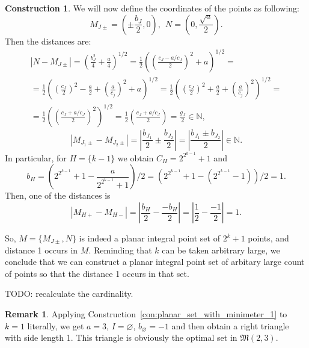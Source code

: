 \documentclass[a4paper,14pt]{article} %
\theoremstyle{plain}
\theoremstyle{definition}
\newtheorem{construction}[theorem]{Construction}
\newtheorem{remark}[theorem]{Remark}
\begin{document}
\begin{construction}
	We will now define the coordinates of the points as following:
	\begin{equation}
		M_{J\pm} =\left(\pm\frac{b_J}{2}, 0\right)
		,
		~~
		N   =\left(0, \frac{\sqrt{a}}{2}\right)
		.
	\end{equation}
	Then the distances are:
	\begin{multline}
		|N - M_{J\pm}|
		=
		\left(\frac{b_J^2}{4} + \frac{a}{4}\right)^{1/2}
		=
		\frac{1}{2}\left(\left(\frac{c_J - a/c_J}{2}\right)^2 + a\right)^{1/2}
		=
		\\=
		\frac{1}{2}\left( \left(\frac{c_J}{2}\right)^2 - \frac{a}{2} + \left(\frac{a}{c_j}\right)^2 + a\right)^{1/2}
		=
		\frac{1}{2}\left( \left(\frac{c_J}{2}\right)^2 + \frac{a}{2} + \left(\frac{a}{c_j}\right)^2    \right)^{1/2}
		=
		\\=
		\frac{1}{2}\left(\left(\frac{c_J + a/c_J}{2}\right)^2\right)^{1/2}
		=
		\frac{1}{2}\left(\frac{c_J + a/c_J}{2}\right)
		=
		\frac{g_J}{2}
		\in\mathbb{N}
		,
	\end{multline}
	\begin{equation}
		|M_{J_1 \pm} - M_{J_2 \pm}|
		=
		\left|\frac{b_{J_1}}{2} \pm \frac{b_{J_2}}{2}\right|
		=
		\left|\frac{b_{J_1} \pm b_{J_2}}{2}\right|
		\in\mathbb{N}
		.
	\end{equation}
	In particular, for $H = \{k-1\}$ we obtain $C_H = 2^{2^{k-1}}+1$ and
	\begin{equation}
		b_H =
		\left( 2^{2^{k-1}}+1 - \frac{a}{2^{2^{k-1}}+1} \right)/2
		=
		\left(2^{2^{k-1}}+1 - \left(  2^{2^{k-1}}-1 \right) \right)/2
		=
		1
		.
	\end{equation}
	Then, one of the distances is
	\begin{equation}
		|M_{H+} - M_{H-}|
		=
		\left|\frac{b_{H}}{2} - \frac{-b_{H}}{2}\right|
		=
		\left|\frac{1}{2} - \frac{-1}{2}\right|
		= 1
		.
	\end{equation}

	So, $M = \{ M_{J\pm}, N\}$ is indeed a planar integral point set of $2^k+1$ points,
	and distance 1 occurs in $M$.
	Reminding that $k$ can be taken arbitrary large, we conclude that we can construct
	a planar integral point set of arbitary large count of points so that the distance 1 occurs in that set.
\end{construction}


TODO: recalculate the cardinality.

\begin{remark}
	Applying Construction~\ref{con:planar_set_with_minimeter_1} to $k=1$ literally,
	we get $a = 3$, $I=\varnothing$, $b_\varnothing = -1$ and then
	obtain a right triangle with side length 1.
	This triangle is obviously the optimal set in $\mathfrak{M}(2,3)$.
\end{remark}
\end{document}
